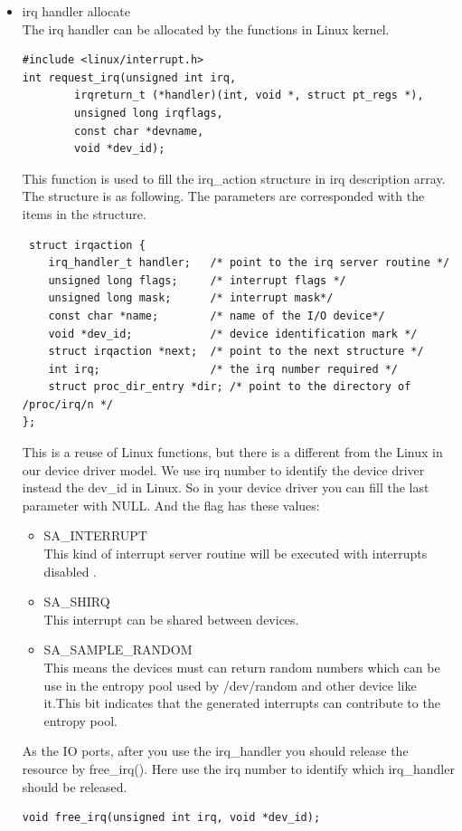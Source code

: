 \begin{itemize}
\begin{itemize}
\item{irq handler allocate}\\
The irq handler can be allocated by the functions in Linux kernel. 

\begin{verbatim}
#include <linux/interrupt.h>
int request_irq(unsigned int irq,
        irqreturn_t (*handler)(int, void *, struct pt_regs *),
        unsigned long irqflags,
        const char *devname,
        void *dev_id);
\end{verbatim}
This function is used to fill the irq\_action structure in irq description array. The structure is as following. The parameters are corresponded with the items in the structure.
\begin{verbatim}
 struct irqaction {
    irq_handler_t handler;   /* point to the irq server routine */
    unsigned long flags;     /* interrupt flags */
    unsigned long mask;      /* interrupt mask*/
    const char *name;        /* name of the I/O device*/
    void *dev_id;            /* device identification mark */
    struct irqaction *next;  /* point to the next structure */
    int irq;                 /* the irq number required */
    struct proc_dir_entry *dir; /* point to the directory of /proc/irq/n */
};
\end{verbatim}
This is a reuse of Linux functions, but there is a different from the Linux in our device driver model. We use irq number to identify the device driver instead the dev\_id in Linux. So in your device driver you can fill the last parameter with NULL. And the flag has these values:
\begin{itemize}
\item{SA\_INTERRUPT}\\
This kind of interrupt server routine will be executed with interrupts disabled .\\

\item{SA\_SHIRQ}\\
This interrupt can be shared between devices. \\

\item{SA\_SAMPLE\_RANDOM}\\
This means the devices must can return random numbers which can be use in the entropy pool used by /dev/random and other device like it.This bit indicates that the generated interrupts can contribute to the entropy pool.\\
\end{itemize}
As the I\/O ports, after you use the irq\_handler you should release the resource by free\_irq(). Here use the irq number to identify which irq\_handler should be released.
\begin{verbatim}
void free_irq(unsigned int irq, void *dev_id);
\end{verbatim}


\end{itemize}
\end{itemize}
